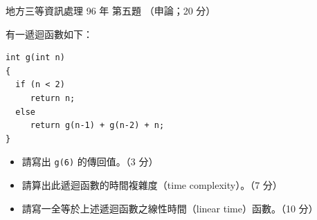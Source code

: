 \begin{pastexam}[label={px:df3-096-ds-05}]{地方三等資訊處理 96 年 第五題}
（申論；20 分）

有一遞迴函數如下：
\begin{verbatim}
int g(int n)
{
  if (n < 2)
     return n;
  else
     return g(n-1) + g(n-2) + n;
}
\end{verbatim}
\begin{itemize}[leftmargin=2em, labelsep=0.3em, itemsep=2pt]
\item[㈠] 請寫出 \texttt{g(6)} 的傳回值。（3 分）
\item[㈡] 請算出此遞迴函數的時間複雜度（time complexity）。（7 分）
\item[㈢] 請寫一全等於上述遞迴函數之線性時間（linear time）函數。（10 分）
\end{itemize}
\end{pastexam}

